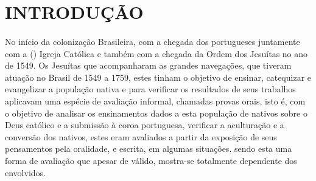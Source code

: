 \section{INTRODUÇÃO}
	\paragraph{}
	    \cite{MOREIRAJUNIOR} No início da colonização Brasileira, com a chegada dos portugueses juntamente com a (\textcite{OLIVEIRA}) Igreja Católica e também com a chegada da Ordem dos Jesuítas no ano de 1549. Os Jesuítas que acompanharam as grandes navegações, que tiveram atuação no Brasil de 1549 a 1759, estes tinham o objetivo de ensinar, catequizar e evangelizar a população nativa e para verificar os resultados de seus trabalhos aplicavam uma espécie de avaliação informal, chamadas provas orais, isto é, com o objetivo de analisar os ensinamentos dados a esta população de nativos sobre o Deus católico e a submissão à coroa portuguesa, verificar a aculturação e a conversão dos nativos, estes eram avaliados a partir da exposição de seus pensamentos pela oralidade, e escrita, em algumas situações. sendo esta uma forma de avaliação que apesar de válido, mostra-se totalmente dependente dos envolvidos.
